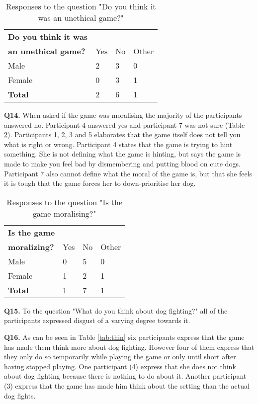 \begin{table}[h]
\centering
\begin{tabular}{l l l l}
\hline
\textbf{Do you think it was}\\
\textbf{an unethical game?} & Yes & No & Other \\
\hline
Male & 2 & 3 & 0 \\
Female & 0 & 3 & 1 \\
\textbf{Total} & 2 & 6 & 1 \\
\hline
\end{tabular}
\caption{\label{tab:ethi}Responses to the question "Do you think it was an unethical game?"}
\end{table}

\textbf{Q14.} When asked if the game was moralising the majority of the participants answered no. Participant 4 answered yes and participant 7 was not sure (Table \ref{tab:mora}). Participants 1, 2, 3 and 5 elaborates that the game itself does not tell you what is right or wrong. Participant 4 states that the game is trying to hint something. She is not defining what the game is hinting, but says the game is made to make you feel bad by dismembering and putting blood on cute dogs. Participant 7 also cannot define what the moral of the game is, but that she feels it is tough that the game forces her to down-prioritise her dog.

\begin{table}[h]
\centering
\begin{tabular}{l l l l}
\hline
\textbf{Is the game}\\
\textbf{moralizing?} & Yes & No & Other \\
\hline
Male & 0 & 5 & 0 \\
Female & 1 & 2 & 1 \\
\textbf{Total} & 1 & 7 & 1 \\
\hline
\end{tabular}
\caption{\label{tab:mora}Responses to the question "Is the game moralising?"}
\end{table}


\textbf{Q15.} To the question "What do you think about dog fighting?" all of the participants expressed disgust of a varying degree towards it. 


\textbf{Q16.} As can be seen in Table \ref{tab:thin} six participants express that the game has made them think more about dog fighting. However four of them express that they only do so temporarily while playing the game or only until short after having stopped playing. One participant (4) express that she does not think about dog fighting because there is nothing to do about it. Another participant (3) express that the game has made him think about the setting than the actual dog fights.

